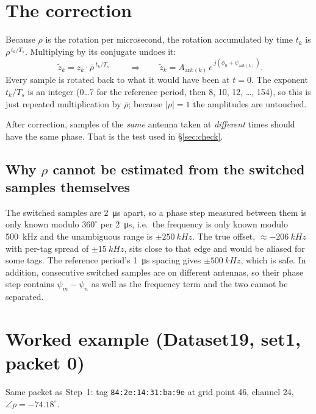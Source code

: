 \documentclass[11pt,a4paper]{article}
\begin{document}
\section{The correction}
Because $\rho$ is the rotation per microsecond, the rotation accumulated by time $t_k$ is $\rho^{\,t_k/T_s}$. Multiplying by its conjugate undoes it:
\[
  \boxed{\;\tilde z_k = z_k\cdot \bar\rho^{\;t_k/T_s}\;}
  \qquad\Longrightarrow\qquad
  \tilde z_k = A_{\mathrm{ant}(k)}\, e^{\,j\left(\phi_0 + \psi_{\mathrm{ant}(k)}\right)} .
\]
Every sample is rotated back to what it would have been at $t = 0$. The exponent $t_k/T_s$ is an integer (0\dots7 for the reference period, then 8, 10, 12, \dots, 154), so this is just repeated multiplication by $\bar\rho$; because $|\rho| = 1$ the amplitudes are untouched.

After correction, samples of the \emph{same} antenna taken at \emph{different} times should have the same phase. That is the test used in \S\ref{sec:check}.

\subsection*{Why $\rho$ cannot be estimated from the switched samples themselves}
The switched samples are \SI{2}{\micro s} apart, so a phase step measured between them is only known modulo $360^\circ$ per \SI{2}{\micro s}, i.e.\ the frequency is only known modulo \SI{500}{kHz} and the unambiguous range is $\pm\SI{250}{kHz}$. The true offset, $\approx -\SI{206}{kHz}$ with per-tag spread of $\pm\SI{15}{kHz}$, sits close to that edge and would be aliased for some tags. The reference period's \SI{1}{\micro s} spacing gives $\pm\SI{500}{kHz}$, which is safe. In addition, consecutive switched samples are on different antennas, so their phase step contains $\psi_m - \psi_n$ as well as the frequency term and the two cannot be separated.

\section{Worked example (Dataset19, set1, packet 0)}
Same packet as Step~1: tag \texttt{84:2e:14:31:ba:9e} at grid point 46, channel 24, $\angle\rho = -74.18^\circ$.
\end{document}
